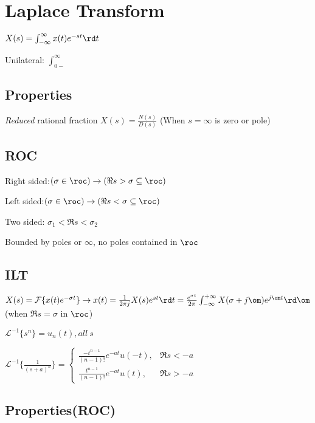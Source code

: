 \section{Laplace Transform}

$X(s) = \int_{-\infty}^{\infty} x(t) e^{-st} \rd t$

Unilateral: $\int_{0-}^{\infty}$

\subsection*{Properties}

\emph{Reduced} rational fraction $X(s) = \frac{N(s)}{D(s)}$ (When $s=\infty$ is zero or pole)

\subsection*{ROC}

Right sided:$(\sigma \in \roc) \to (\Re{s}>\sigma \subseteq \roc)$

Left sided:$(\sigma \in \roc) \to (\Re{s}<\sigma \subseteq \roc)$

Two sided: $\sigma_1<\Re s<\sigma_2$

Bounded by poles or $\infty$, no poles contained in $\roc$

\subsection*{ILT}

$X(s)=\mathcal F\{x(t)e^{-\sigma t}\}\to x(t)=\frac{1}{2\pi j} X(s) e^{st}\rd t \\ = \frac{e^{\sigma t}}{2\pi}\int_{-\infty}^{+\infty} X(\sigma + j\om) e^{j\om t}\rd \om$ (when $\Re s =\sigma$ in $\roc$)

$\mathcal L^{-1}\{s^n\} = u_n(t), all~s$

$\mathcal L^{-1}\{\frac{1}{(s+a)^n}\} = \begin{cases} \frac{-t^{n-1}}{(n-1)!}e^{-at}u(-t), & \Re s <-a\\ \frac{t^{n-1}}{(n-1)!}e^{-at}u(t), & \Re s >-a\end{cases}$

\subsection*{Properties(ROC)}

